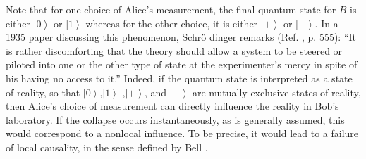 \documentclass[pra,nofootinbib,showpacs,12pt]{revtex4}
\begin{document}
Note that for one choice of Alice's measurement, the final quantum state for
$B$ is either $\left| 0\right\rangle $ or $\left| 1\right\rangle $ whereas
for the other choice, it is either $\left| +\right\rangle $ or $\left|
-\right\rangle .$ In a 1935 paper discussing this phenomenon, Schr\"{o}%
dinger remarks (Ref. \cite{Schroedinger}, p. 555): ``It is rather
discomforting that the theory should allow a system to be steered or piloted
into one or the other type of state at the experimenter's mercy in spite of
his having no access to it.'' Indeed, if the quantum state is interpreted as
a state of reality, so that $\left| 0\right\rangle $,$\left| 1\right\rangle $%
,$\left| +\right\rangle $, and $\left| -\right\rangle $ are mutually
exclusive states of reality, then Alice's choice of measurement can directly
influence the reality in Bob's laboratory. If the collapse occurs
instantaneously, as is generally assumed, this would correspond to a
nonlocal influence. To be precise, it would lead to a failure of local
causality, in the sense defined by Bell \cite{Belllocalbeables}.
\end{document}
